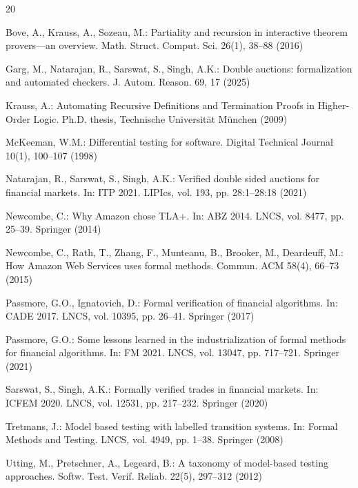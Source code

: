 \documentclass[runningheads]{llncs}
\begin{document}
\begin{thebibliography}{20}

Bove, A., Krauss, A., Sozeau, M.: Partiality and recursion in interactive
theorem provers---an overview. Math. Struct. Comput. Sci. 26(1), 38--88 (2016)

Garg, M., Natarajan, R., Sarswat, S., Singh, A.K.: Double auctions:
formalization and automated checkers. J. Autom. Reason. 69, 17 (2025)

Krauss, A.: Automating Recursive Definitions and Termination Proofs in
Higher-Order Logic. Ph.D. thesis, Technische Universit\"at M\"unchen (2009)

McKeeman, W.M.: Differential testing for software. Digital Technical Journal
10(1), 100--107 (1998)

Natarajan, R., Sarswat, S., Singh, A.K.: Verified double sided auctions for
financial markets. In: ITP 2021. LIPIcs, vol. 193, pp. 28:1--28:18 (2021)

Newcombe, C.: Why Amazon chose TLA+. In: ABZ 2014. LNCS, vol. 8477,
pp. 25--39. Springer (2014)

Newcombe, C., Rath, T., Zhang, F., Munteanu, B., Brooker, M., Deardeuff, M.:
How Amazon Web Services uses formal methods. Commun. ACM 58(4), 66--73 (2015)

Passmore, G.O., Ignatovich, D.: Formal verification of financial algorithms.
In: CADE 2017. LNCS, vol. 10395, pp. 26--41. Springer (2017)

Passmore, G.O.: Some lessons learned in the industrialization of formal
methods for financial algorithms. In: FM 2021. LNCS, vol. 13047,
pp. 717--721. Springer (2021)

Sarswat, S., Singh, A.K.: Formally verified trades in financial markets.
In: ICFEM 2020. LNCS, vol. 12531, pp. 217--232. Springer (2020)

Tretmans, J.: Model based testing with labelled transition systems. In:
Formal Methods and Testing. LNCS, vol. 4949, pp. 1--38. Springer (2008)

Utting, M., Pretschner, A., Legeard, B.: A taxonomy of model-based testing
approaches. Softw. Test. Verif. Reliab. 22(5), 297--312 (2012)

\end{thebibliography}
\end{document}
